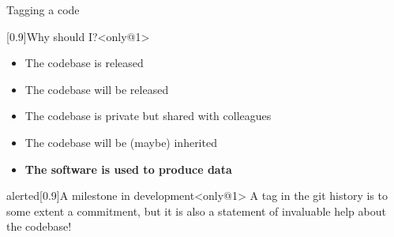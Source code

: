 \documentclass[usenames,svgnames,14pt]{beamer}
\begin{document}
\begin{frame}[fragile]{Tagging a code}
    \vspace{-3mm}
    \begin{varblock}{}[0.9\textwidth]{Why should I?}<only@1>
        \begin{itemize}
            \item The codebase is released
            \item The codebase will be released
            \item The codebase is  private but shared with colleagues
            \item The codebase will be (maybe) inherited
            \item \textbf{The software is used to produce data}
        \end{itemize}
    \end{varblock}
    \begin{varblock}{alerted}[0.9\textwidth]{A milestone in development}<only@1>
        A tag in the git history is to some extent a commitment, but it is also a statement of invaluable help about the codebase!
    \end{varblock}
\end{frame}


\end{document}
